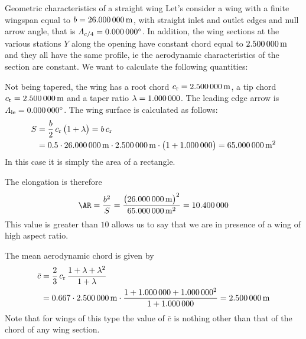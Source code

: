 \documentclass[[12pt,twoside]{book}
\begin{document}
\begin{myExampleX}{Geometric characteristics of a straight wing}{}%
\label{example:Geometric:Characteristics:Of:A:Straight:Wing}
%
\noindent
Let's consider a wing with a finite wingspan equal to $b=\SI[round-precision=1]{\mySpanWingMT}{\metre}$,
with straight inlet and outlet edges and
null arrow angle, that is $\Lambda_{c/4}=\SI[round-precision=0]{\myLambdaCQuarter}{\degree}$.
In addition, the wing sections at the various stations $Y$ along the opening have constant chord
equal to $\SI[round-precision=2]{\myChordRootWingMT}{\metre}$
and they all have the same profile, ie the aerodynamic characteristics of the section are constant.
We want to calculate the following quantities:

\noindent
{}%

\medskip
\noindent
Not being tapered, the wing has a root chord
$c_\mathrm{r}=\SI[round-precision=2]{\myChordRootWingMT}{\metre}$,
a tip chord $c_\mathrm{t}=\SI[round-precision=2]{\myChordTipWingMT}{\metre}$
and a taper ratio $\lambda=\SI[round-precision=0]{\myTaperRatioWing}{}$.
The leading edge arrow is
 $\Lambda_\mathrm{le}=\SI[round-precision=0]{\myLambdaCQuarter}{\degree}$.
\noindent
The wing surface is calculated as follows:
\[
\begin{split}
S & {}= \frac{b}{2} \, c_\mathrm{r} \, \big( 1 + \lambda \big) = b\,c_\mathrm{r}\\
  & {}=
    \num{0.5} \cdot \SI[round-precision=1]{\mySpanWingMT}{\metre}
      \cdot \SI[round-precision=2]{\myChordRootWingMT}{\metre}
      \cdot \big( 1 + \SI[round-precision=0]{\myTaperRatioWing}{} \big) 
    = { \SI[round-precision=1]{\myAreaWingMTsquared}{\metre^2} }
\end{split}
\]
In this case it is simply the area of a rectangle.

\noindent
The elongation is therefore
\[
\AR 
  = \frac{b^2}{S}
  = \frac{\big(\SI[round-precision=1]{\mySpanWingMT}{\metre}\big)^2}{\SI[round-precision=1]{\myAreaWingMTsquared}{\metre^2}}
  ={ \num[round-precision=2]{\myAspectRatioWing} }
\]
This value is greater than $\num[round-precision=0]{10}$ allows us to say that we are in
presence of a wing of high aspect ratio.


\noindent
The mean aerodynamic chord is given by
 
\[
\begin{split}
\bar{c} & {}= \frac{2}{3} \, c_\mathrm{r} \, \frac{1+\lambda + \lambda^2}{1+\lambda} \\
  & {}=
    \num{0.667} \cdot \SI[round-precision=2]{\myChordRootWingMT}{\metre}
      \cdot 
        \frac{
          1 + \SI[round-precision=0]{\myTaperRatioWing}{} + \SI[round-precision=0]{\myTaperRatioWing}{}^2
        }{
          1 + \SI[round-precision=0]{\myTaperRatioWing}{}
        }
    = \SI[round-precision=2]{\myMACWingMT}{\metre} 
\end{split}
\]
Note that for wings of this type the value of $\bar{c} $ is nothing other than that of the chord
of any wing section.


\end{myExampleX}
\end{document}
